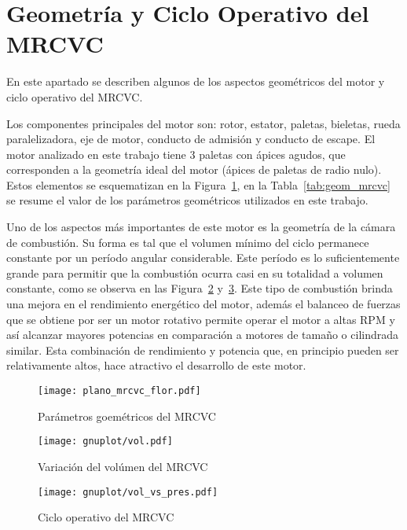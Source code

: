 \section{Geometría y Ciclo Operativo del MRCVC}
%
En este apartado se describen algunos de los aspectos geométricos del motor y
ciclo operativo del MRCVC.

Los componentes principales del motor son: rotor, estator, paletas, bieletas,
rueda paralelizadora, eje de motor, conducto de admisión y conducto de escape.
%
El motor analizado en este trabajo tiene 3 paletas con ápices agudos, que
corresponden a la geometría ideal del motor (ápices de paletas de radio nulo).
%
Estos elementos se esquematizan en la Figura~\ref{fig:geom_flor_mrcvc}, en la
Tabla~\ref{tab:geom_mrcvc} se resume el valor de los parámetros geométricos
utilizados en este trabajo.

Uno de los aspectos más importantes de este motor es la geometría de la cámara
de combustión.
%
Su forma es tal que el volumen mínimo del ciclo permanece constante por un
período angular considerable. %
%
Este período es lo suficientemente grande para permitir que la combustión ocurra
casi en su totalidad a volumen constante, como se observa en las
Figura~\ref{fig:mrcvc_vol_cte} y~\ref{fig:PV_mrcvc}.
%
Este tipo de combustión brinda una mejora en el rendimiento energético del motor,
además el balanceo de fuerzas que se obtiene por ser un motor rotativo permite
operar el motor a altas RPM y así alcanzar mayores potencias en comparación a
motores de tamaño o cilindrada similar.
%
Esta combinación de rendimiento y potencia que, en principio pueden ser
relativamente altos, hace atractivo el desarrollo de este motor.
%

\begin{figure}[ht]
  \centering
  \texttt{[image: plano\_mrcvc\_flor.pdf]}
  \caption{Parámetros goemétricos del MRCVC}\label{fig:geom_flor_mrcvc}
\end{figure}

\begin{figure}[ht]
  \centering
  \texttt{[image: gnuplot/vol.pdf]}
  \caption{Variación del volúmen del MRCVC}\label{fig:mrcvc_vol_cte}
\end{figure}

\begin{figure}[ht]
  \centering
  \texttt{[image: gnuplot/vol\_vs\_pres.pdf]}
  \caption{Ciclo operativo del MRCVC}\label{fig:PV_mrcvc}
\end{figure}



